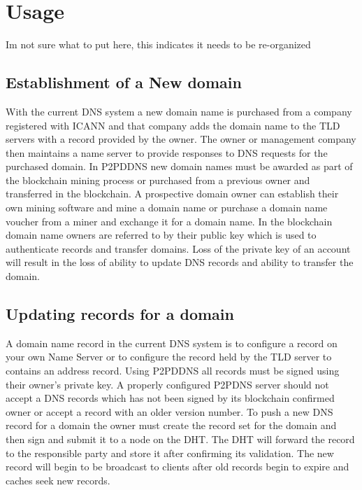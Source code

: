 \documentclass[11pt]{ieeetran} %
\begin{document}
\section{Usage}
Im not sure what to put here, this indicates it needs to be re-organized
\subsection{Establishment of a New domain}
With the current DNS system a new domain name is purchased from a company registered with ICANN and that company adds the domain name to the TLD servers with a record provided by the owner. The owner or management company then maintains a name server to provide responses to DNS requests for the purchased domain. In P2PDDNS new domain names must be awarded as part of the blockchain mining process or purchased from a previous owner and transferred in the blockchain. A prospective domain owner can establish their own mining software and mine a domain name or purchase a domain name voucher from a miner and exchange it for a domain name. In the blockchain domain name owners are referred to by their public key which is used to authenticate records and transfer domains. Loss of the private key of an account will result in the loss of ability to update DNS records and ability to transfer the domain. 

\subsection{Updating records for a domain}
A domain name record in the current DNS system is to configure a record on your own Name Server or to configure the record held by the TLD server to contains an address record. Using P2PDDNS all records must be signed using their owner's private key. A properly configured P2PDNS server should not accept a DNS records which has not been signed by its blockchain confirmed owner or accept a record with an older version number. To push a new DNS record for a domain the owner must create the record set for the domain and then sign and submit it to a node on the DHT. The DHT will forward the record to the responsible party and store it after confirming its validation. The new record will begin to be broadcast to clients after old records begin to expire and caches seek new records.
\end{document}
